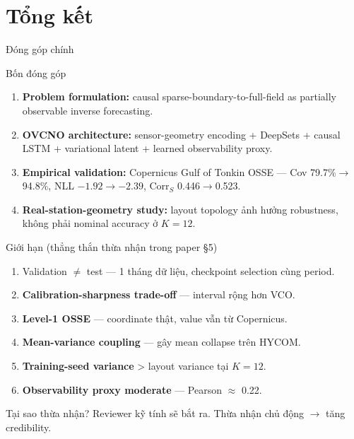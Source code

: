 \documentclass[11pt,aspectratio=169]{beamer}
\begin{document}
\section{Tổng kết}

\begin{frame}{Đóng góp chính}
  \begin{block}{Bốn đóng góp}
    \begin{enumerate}\itemsep4pt
      \item \textbf{Problem formulation:} causal sparse-boundary-to-full-field as partially observable inverse forecasting.
      \item \textbf{OVCNO architecture:} sensor-geometry encoding + DeepSets + causal LSTM + variational latent + \alert{learned observability proxy}.
      \item \textbf{Empirical validation:} Copernicus Gulf of Tonkin OSSE --- Cov 79.7\%$\to$94.8\%, NLL $-1.92 \to -2.39$, Corr$_S$ 0.446$\to$0.523.
      \item \textbf{Real-station-geometry study:} layout topology ảnh hưởng \alert{robustness}, không phải nominal accuracy ở $K=12$.
    \end{enumerate}
  \end{block}
\end{frame}

\begin{frame}{Giới hạn (thẳng thắn thừa nhận trong paper §5)}
  \small
  \begin{enumerate}\itemsep3pt
    \item \alert{Validation $\ne$ test} --- 1 tháng dữ liệu, checkpoint selection cùng period.
    \item \textbf{Calibration-sharpness trade-off} --- interval rộng hơn VCO.
    \item \textbf{Level-1 OSSE} --- coordinate thật, value vẫn từ Copernicus.
    \item \textbf{Mean-variance coupling} --- gây mean collapse trên HYCOM.
    \item \textbf{Training-seed variance} > layout variance tại $K{=}12$.
    \item \textbf{Observability proxy moderate} --- Pearson $\approx$ 0.22.
  \end{enumerate}

  \vspace{6pt}
  \begin{block}{Tại sao thừa nhận?}
    Reviewer kỹ tính sẽ bắt ra. Thừa nhận chủ động $\to$ tăng credibility.
  \end{block}
\end{frame}
\end{document}
